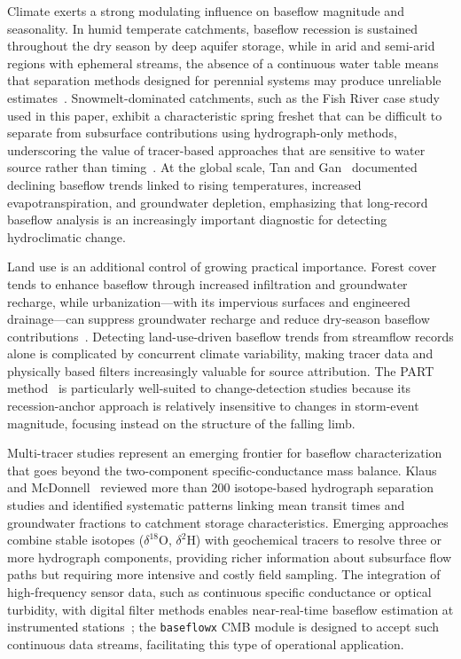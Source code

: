 \documentclass[hydrology,article,submit,pdftex,moreauthors]{Definitions/mdpi}
\begin{document}
Climate exerts a strong modulating influence on baseflow magnitude and seasonality. In humid temperate catchments, baseflow recession is sustained throughout the dry season by deep aquifer storage, while in arid and semi-arid regions with ephemeral streams, the absence of a continuous water table means that separation methods designed for perennial systems may produce unreliable estimates~\cite{Wittenberg1999,McMahon2021}. Snowmelt-dominated catchments, such as the Fish River case study used in this paper, exhibit a characteristic spring freshet that can be difficult to separate from subsurface contributions using hydrograph-only methods, underscoring the value of tracer-based approaches that are sensitive to water source rather than timing~\cite{Klaus2013}. At the global scale, Tan and Gan~\cite{Tan2020} documented declining baseflow trends linked to rising temperatures, increased evapotranspiration, and groundwater depletion, emphasizing that long-record baseflow analysis is an increasingly important diagnostic for detecting hydroclimatic change.

Land use is an additional control of growing practical importance. Forest cover tends to enhance baseflow through increased infiltration and groundwater recharge, while urbanization---with its impervious surfaces and engineered drainage---can suppress groundwater recharge and reduce dry-season baseflow contributions~\cite{Smakhtin2001}. Detecting land-use-driven baseflow trends from streamflow records alone is complicated by concurrent climate variability, making tracer data and physically based filters increasingly valuable for source attribution. The PART method~\cite{Rutledge1998} is particularly well-suited to change-detection studies because its recession-anchor approach is relatively insensitive to changes in storm-event magnitude, focusing instead on the structure of the falling limb.

Multi-tracer studies represent an emerging frontier for baseflow characterization that goes beyond the two-component specific-conductance mass balance. Klaus and McDonnell~\cite{Klaus2013} reviewed more than 200 isotope-based hydrograph separation studies and identified systematic patterns linking mean transit times and groundwater fractions to catchment storage characteristics. Emerging approaches combine stable isotopes ($\delta^{18}$O, $\delta^{2}$H) with geochemical tracers to resolve three or more hydrograph components, providing richer information about subsurface flow paths but requiring more intensive and costly field sampling. The integration of high-frequency sensor data, such as continuous specific conductance or optical turbidity, with digital filter methods enables near-real-time baseflow estimation at instrumented stations~\cite{Miller2015}; the \texttt{baseflowx} CMB module is designed to accept such continuous data streams, facilitating this type of operational application.
\end{document}
